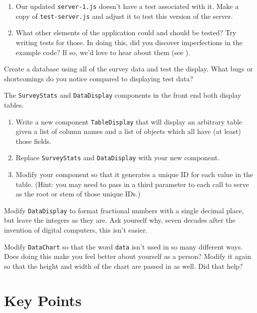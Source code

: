 \begin{enumerate}
\item
  Our updated \texttt{server-1.js} doesn't have a test associated with it.
  Make a copy of \texttt{test-server.js} and adjust it to test this version of the
  server.
\item
  What other elements of the application could and should be tested?
  Try writing tests for those.
  In doing this, did you discover imperfections in the example code?
  If so, we'd love to hear about them (see ).
\end{enumerate}


Create a database using all of the survey data and test the display.
What bugs or shortcomings do you notice compared to displaying test data?


The \texttt{SurveyStats} and \texttt{DataDisplay} components in the front end both display tables.

\begin{enumerate}
\item
  Write a new component \texttt{TableDisplay} that will display an arbitrary table
  given a list of column names
  and a list of objects which all have (at least) those fields.
\item
  Replace \texttt{SurveyStats} and \texttt{DataDisplay} with your new component.
\item
  Modify your component so that it generates a unique ID for each value in the table.
  (Hint: you may need to pass in a third parameter to each call
  to serve as the root or stem of those unique IDs.)
\end{enumerate}


Modify \texttt{DataDisplay} to format fractional numbers with a single decimal place,
but leave the integers as they are.
Ask yourself why,
seven decades after the invention of digital computers,
this isn't easier.


Modify \texttt{DataChart} so that the word \texttt{data} isn't used in so many different ways.
Does doing this make you feel better about yourself as a person?
Modify it again so that the height and width of the chart are passed in as well.
Did that help?

\section*{Key Points}


